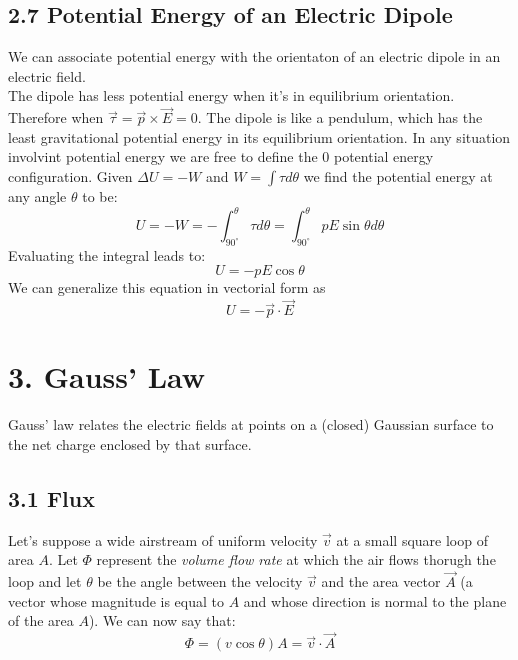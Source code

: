 \documentclass[12pt, a4paper]{article}
\begin{document}
		
		\subsection*{2.7 Potential Energy of an Electric Dipole}
		
		We can associate potential energy with the orientaton of an electric dipole in an electric field. \\
		The dipole has less potential energy when it's in equilibrium orientation. Therefore when $\vec{\tau} = \vec{p} \times \vec{E} = 0$. The dipole is like a pendulum, which has the least gravitational potential energy in its equilibrium orientation. In any situation involvint potential energy we are free to define the 0 potential energy configuration. Given $\Delta U = -W$ and $W = \int \tau d\theta$ we find the potential energy at any angle $\theta$ to be:
		\begin{equation*}
			U = -W = -\int_{90^\circ}^{\theta} \tau d\theta = \int_{90^\circ}^{\theta} pE\sin\theta d\theta
			\tag{2-23}
		\end{equation*}
		Evaluating the integral leads to:
		\begin{equation*}
			U = -pE\cos\theta
			\tag{2-24}
		\end{equation*}
		We can generalize this equation in vectorial form as
		\begin{equation*}
			U = -\vec{p} \cdot \vec{E}
			\tag{Potential Energy of a Dipole, 2-25}
		\end{equation*}
		
		
		\newpage
		\section*{3. Gauss' Law}
		
		
		Gauss’ law relates the electric fields at points on a (closed) Gaussian surface to the net charge enclosed by that surface.
		
		
		\subsection*{3.1 Flux}
		
		Let's suppose a wide airstream of uniform velocity $\vec{v}$ at a small square loop of area $A$. Let \textbf{$\Phi$} represent the \textit{volume flow rate} at which the air flows thorugh the loop and let $\theta$ be the angle between the velocity $\vec{v}$ and the area vector $\vec{A}$ (a vector whose magnitude is equal to $A$ and whose direction is normal to the plane of the area $A$). We can now say that:
		\begin{equation*}
			\textbf{$\Phi$} = (v\cos\theta)A = \vec{v} \cdot \vec{A}
			\tag{3-1}
		\end{equation*}
		
\end{document}

